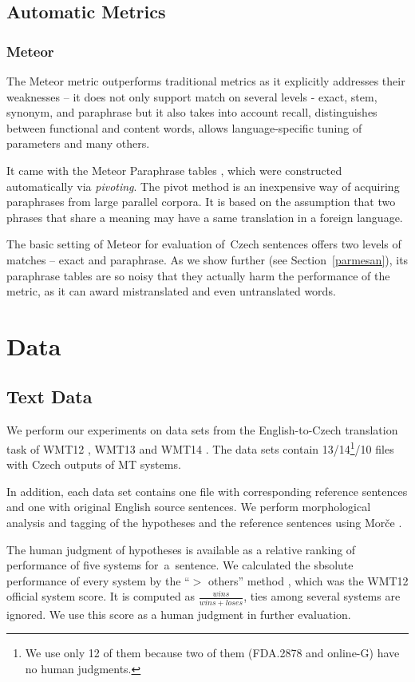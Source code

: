 \documentclass[11pt]{article}
\def\Sref#1{Section~\ref{#1}}
\begin{document}
\subsection{Automatic Metrics}

\subsubsection{Meteor}
The Meteor metric outperforms traditional metrics as it explicitly addresses 
their weaknesses -- it does not only support match on several levels -  exact, 
stem, synonym, and paraphrase but it also takes into account recall, 
distinguishes between functional and content words, allows language-specific 
tuning of parameters and many others.

It came with the Meteor Paraphrase tables \cite{meteor-tables}, which were
constructed automatically via \textit{pivoting}. \cite{pivoting} The pivot 
method is an inexpensive way of acquiring paraphrases from large parallel 
corpora. It is based on the assumption that two phrases that share a meaning 
may have a same translation in a foreign language. \cite{dyvik}

The basic setting of Meteor for evaluation of~Czech sentences offers two levels 
of matches -- exact and paraphrase. As we show further (see \Sref{parmesan}), 
its paraphrase tables are so noisy that they actually harm the performance of 
the metric, as it can award mistranslated and even untranslated words.


\section{Data}
\label{Data}
\subsection{Text Data}
We perform our experiments on data sets from the English-to-Czech translation 
task of WMT12 \cite{wmt12}, WMT13 \cite{wmt13} and WMT14 \cite{wmt14}. The data
sets contain 13/14\footnote{We use only 12 of them because two of them 
(FDA.2878 and online-G) have no human judgments.}/10 files with Czech outputs 
of MT systems.

In addition, each data set contains one file with corresponding reference 
sentences and one with original English source sentences. We perform 
morphological analysis and tagging of the hypotheses and the reference 
sentences using Morče \cite{morce:2007}.

The human judgment of hypotheses is available as a relative ranking of 
performance of five systems for~a~sentence. We calculated the sbsolute 
performance of every system by the “$ > $ others” method \cite{bojar-grains}, 
which was the WMT12 official system score. It is computed as 
$ \frac{wins}{wins+loses} $, ties among several systems are ignored. We use 
this score as a human judgment in further evaluation.
\end{document}
